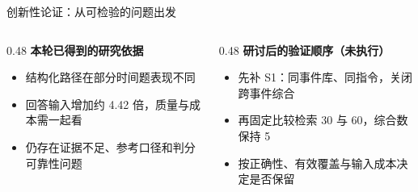 \documentclass[aspectratio=169,10pt]{beamer}
\begin{document}
\begin{frame}{创新性论证：从可检验的问题出发}
\small
\begin{columns}[T]
\begin{column}{0.48\textwidth}
\textbf{本轮已得到的研究依据}\par\vspace{3mm}
\begin{itemize}
\item 结构化路径在部分时间题表现不同
\item 回答输入增加约 4.42 倍，质量与成本需一起看
\item 仍存在证据不足、参考口径和判分可靠性问题
\end{itemize}\end{column}
\begin{column}{0.48\textwidth}
\textbf{研讨后的验证顺序（未执行）}\par\vspace{3mm}
\begin{itemize}
\item 先补 S1：同事件库、同指令，关闭跨事件综合
\item 再固定比较检索 30 与 60，综合数保持 5
\item 按正确性、有效覆盖与输入成本决定是否保留
\end{itemize}\end{column}
\end{columns}
\end{frame}
\end{document}
